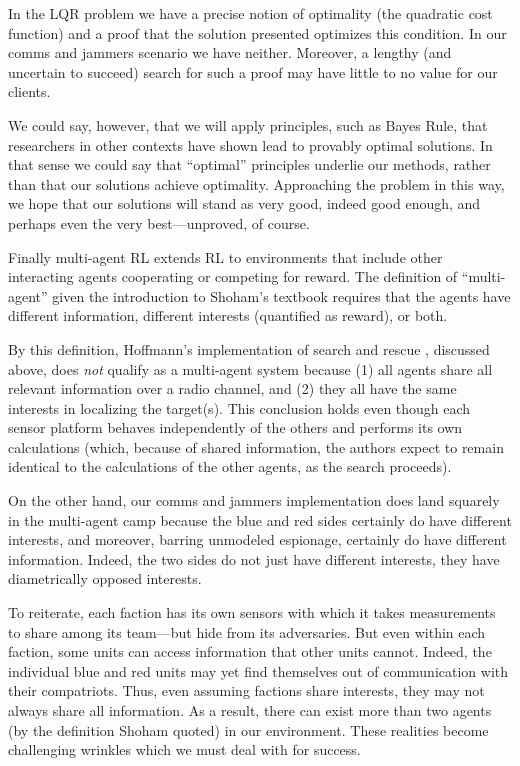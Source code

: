 \documentclass{article}
\begin{document}
In the LQR problem we have a precise notion of optimality (the
quadratic cost function) and a proof that the solution presented
optimizes this condition.  In our comms and jammers scenario we have
neither.  Moreover, a lengthy (and uncertain to succeed) search for
such a proof may have little to no value for our clients.

We could say, however, that we will apply principles, such as Bayes
Rule, that researchers in other contexts have shown lead to provably
optimal solutions.  In that sense we could say that ``optimal''
principles underlie our methods, rather than that our solutions
achieve optimality.  Approaching the problem in this way, we hope that
our solutions will stand as very good, indeed good enough, and perhaps
even the very best---unproved, of course.

Finally multi-agent RL \cite{bucsoniu2010multi} extends RL to
environments that include other interacting agents cooperating or
competing for reward.  The definition of ``multi-agent'' given the
introduction to Shoham's textbook \cite{shoham2008multiagent} requires
that the agents have different information, different interests
(quantified as reward), or both.

By this definition, Hoffmann's implementation of search and rescue
\cite{hoffmann2009mobile}, discussed above, does \emph{not} qualify as
a multi-agent system because (1) all agents share all relevant
information over a radio channel, and (2) they all have the same
interests in localizing the target(s).  This conclusion holds even
though each sensor platform behaves independently of the others and
performs its own calculations (which, because of shared information,
the authors expect to remain identical to the calculations of the
other agents, as the search proceeds).

On the other hand, our comms and jammers implementation does land
squarely in the multi-agent camp because the blue and red sides
certainly do have different interests, and moreover, barring unmodeled
espionage, certainly do have different information.  Indeed, the two
sides do not just have different interests, they have diametrically
opposed interests.

To reiterate, each faction has its own sensors with which it takes
measurements to share among its team---but hide from its adversaries.
But even within each faction, some units can access information that
other units cannot.  Indeed, the individual blue and red units may yet
find themselves out of communication with their compatriots.  Thus,
even assuming factions share interests, they may not always share all
information.  As a result, there can exist more than two agents (by
the definition Shoham quoted) in our environment.  These realities
become challenging wrinkles which we must deal with for success.
\end{document}
